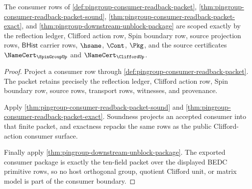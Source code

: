 \begin{theorem}
\label{thm:pingroup-consumer-boundary-scope-package}
The consumer rows of \autoref{def:pingroup-consumer-readback-packet},
\autoref{thm:pingroup-consumer-readback-packet-sound},
\autoref{thm:pingroup-consumer-readback-packet-exact}, and
\autoref{thm:pingroup-downstream-unblock-package} are scoped exactly by the
reflection ledger, Clifford action row, Spin boundary row, source projection
rows, $\mathsf{BHist}$ carrier rows, $\hsame$, $\Cont$, $\Pkg$, and the source
certificates $\NameCert_{\SpinGroupUp}$ and $\NameCert_{\CliffordUp}$.
\end{theorem}
\begin{proof}
Project a consumer row through
\autoref{def:pingroup-consumer-readback-packet}. The packet retains precisely
the reflection ledger, Clifford action row, Spin boundary row, source rows,
transport rows, witnesses, and provenance.

Apply \autoref{thm:pingroup-consumer-readback-packet-sound} and
\autoref{thm:pingroup-consumer-readback-packet-exact}. Soundness projects an
accepted consumer into that finite packet, and exactness repacks the same rows
as the public Clifford-action consumer surface.

Finally apply \autoref{thm:pingroup-downstream-unblock-package}. The exported
consumer package is exactly the ten-field packet over the displayed BEDC
primitive rows, so no host orthogonal group, quotient Clifford unit, or matrix
model is part of the consumer boundary.
\end{proof}
